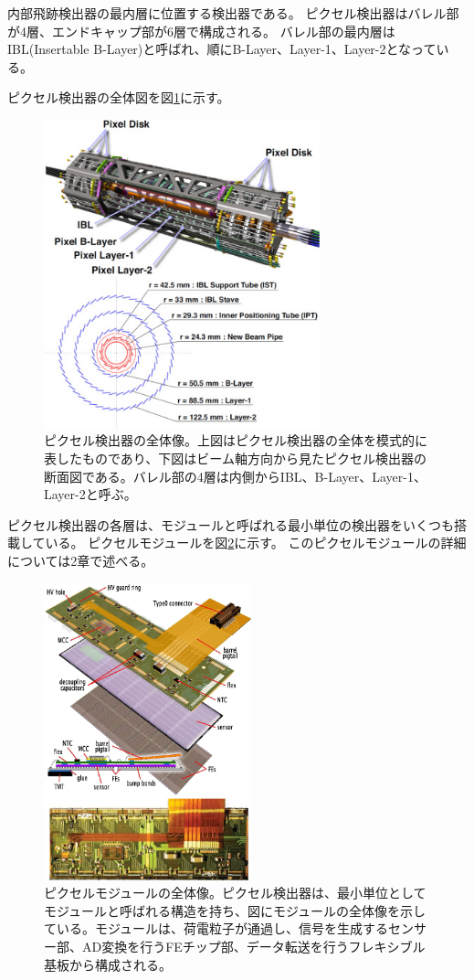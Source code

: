 内部飛跡検出器の最内層に位置する検出器である。
ピクセル検出器はバレル部が4層、エンドキャップ部が6層で構成される。
バレル部の最内層はIBL(Insertable B-Layer)と呼ばれ、順にB-Layer、Layer-1、Layer-2となっている。

ピクセル検出器の全体図を図\ref{pixel_detector_overview}に示す。
\begin{figure}[bpt]\centering
\includegraphics[width=8cm]{./pixel_detector_overview.jpg}
\caption[ピクセル検出器の全体像]{ピクセル検出器の全体像\cite{1-5}。上図はピクセル検出器の全体を模式的に表したものであり、下図はビーム軸方向から見たピクセル検出器の断面図である。バレル部の4層は内側からIBL、B-Layer、Layer-1、Layer-2と呼ぶ。}
\label{pixel_detector_overview}
\end{figure}

ピクセル検出器の各層は、モジュールと呼ばれる最小単位の検出器をいくつも搭載している。
ピクセルモジュールを図\ref{pixel_detector}に示す。
このピクセルモジュールの詳細については2章で述べる。
\begin{figure}[bpt]\centering
\includegraphics[width=6cm]{./pixel_detector.png}
\caption[ピクセルモジュールの全体像。]{ピクセルモジュールの全体像\cite{1-2}。ピクセル検出器は、最小単位としてモジュールと呼ばれる構造を持ち、図にモジュールの全体像を示している。モジュールは、荷電粒子が通過し、信号を生成するセンサー部、AD変換を行うFEチップ部、データ転送を行うフレキシブル基板から構成される。}
\label{pixel_detector}
\end{figure}


